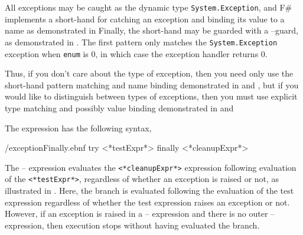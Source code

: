 \documentclass[fsharpNotes.tex]{subfiles}
\begin{document}
All exceptions may be caught as the dynamic type \lstinline{System.Exception}, and F\# implements a short-hand for catching an exception and binding its value to a name as demonstrated in 
%
%
Finally, the short-hand may be guarded with a --guard, as demonstrated in .
%
%
The first pattern only matches the \lstinline{System.Exception} exception when \lstinline{enum} is 0, in which case the exception handler returns 0.

Thus, if you don't care about the type of exception, then you need only use the short-hand pattern matching and name binding demonstrated in  and , but if you would like to distinguish between types of exceptions, then you must use explicit type matching and possibly value binding demonstrated in  and 

The  expression has the following syntax,
%
\begin{verbatimwrite}{\ebnf/exceptionFinally.ebnf}
try
   <*testExpr*>
finally
   <*cleanupExpr*>
\end{verbatimwrite}
%
The -- expression evaluates the \lstinline[language=syntax]{<*cleanupExpr*>} expression following evaluation of the \lstinline[language=syntax]{<*testExpr*>}, regardless of whether an exception is raised or not, as illustrated in .
%
%
Here, the  branch is evaluated following the evaluation of the test expression regardless of whether the test expression raises an exception or not. However, if an exception is raised in a -- expression and there is no outer -- expression, then execution stops without having evaluated the  branch.
\end{document}
